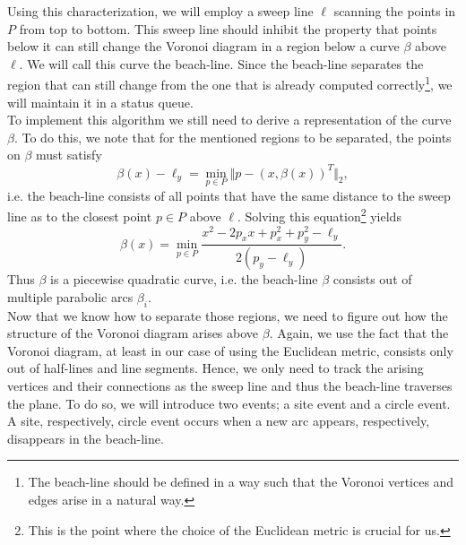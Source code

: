         Using this characterization, we will employ a sweep line $\ell$ scanning the points in $P$ from top to bottom. This sweep line should inhibit the property that points below it can still change the Voronoi diagram in a region below a curve $\beta$ above $\ell$. We will call this curve the beach-line. Since the beach-line separates the region that can still change from the one that is already computed correctly\footnote{The beach-line should be defined in a way such that the Voronoi vertices and edges arise in a natural way.}, we will maintain it in a status queue. \\
        To implement this algorithm we still need to derive a representation of the curve $\beta$. To do this, we note that for the mentioned regions to be separated, the points on $\beta$ must satisfy
        $$\beta(x) - \ell_y = \min_{p \in P}\Vert p - (x, \beta(x))^T \Vert_2 ,$$
        i.e. the beach-line consists of all points that have the same distance to the sweep line as to the closest point $p \in P$ above $\ell$. Solving this equation\footnote{This is the point where the choice of the Euclidean metric is crucial for us.} yields
        $$\beta(x) = \min_{p \in P} \frac{x^2 - 2p_xx + p_x^2 + p_y^2 - \ell_y}{2(p_y - \ell_y)} .$$
        Thus $\beta$ is a piecewise quadratic curve, i.e. the beach-line $\beta$ consists out of multiple parabolic arcs $\beta_i$. \\
        Now that we know how to separate those regions, we need to figure out how the structure of the Voronoi diagram arises above $\beta$. Again, we use the fact that the Voronoi diagram, at least in our case of using the Euclidean metric, consists only out of half-lines and line segments. Hence, we only need to track the arising vertices and their connections as the sweep line and thus the beach-line traverses the plane. To do so, we will introduce two events; a site event and a circle event. A site, respectively, circle event occurs when a new arc appears, respectively, disappears in the beach-line. 

